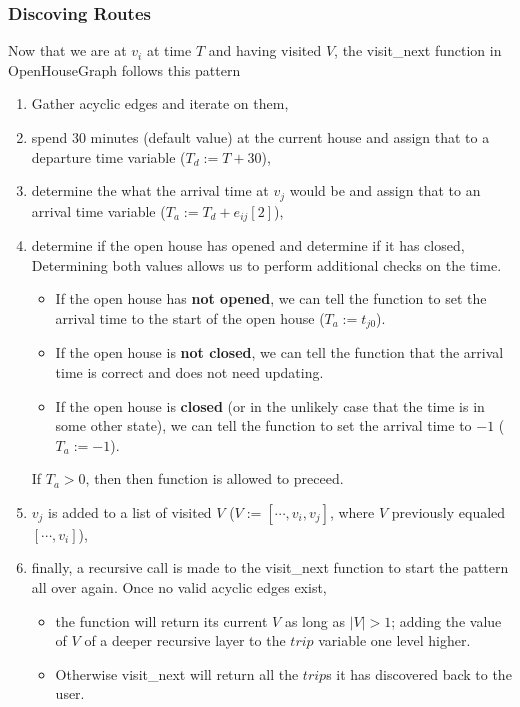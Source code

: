 \documentclass[letterpaper,11pt]{report}
\theoremstyle{definition}
\theoremstyle{definition}
\begin{document}
\subsubsection{Discoving Routes}
Now that we are at $v_i$ at time $T$ and having visited $V$, the \textsf{visit\_next} function in \textsf{OpenHouseGraph} follows this pattern
\begin{enumerate}
  \item Gather acyclic edges and iterate on them,
  \item spend 30 minutes (default value) at the current house and assign that to a departure time variable ($T_d := T + 30$),
  \item determine the what the arrival time at $v_j$ would be and assign that to an arrival time variable ($T_a := T_d + e_{ij}[2]$),
  \item determine if the open house has opened and determine if it has closed,\\
  \hspace*{0.5em} Determining both values allows us to perform additional checks on the time.
    \begin{itemize}
      \item If the open house has \textbf{not opened}, we can tell the function to set the arrival time to the start of the open house ($T_a := t_{j0}$).
      \item If the open house is \textbf{not closed}, we can tell the function that the arrival time is correct and does not need updating.
      \item If the open house is \textbf{closed} (or in the unlikely case that the time is in some other state), we can tell the function to set the arrival time to $-1$ ($T_a := -1$).
    \end{itemize}
    \hspace*{0.5em} If $T_a > 0$, then then function is allowed to preceed.
  \item $v_j$ is added to a list of visited $V$ ($V := [\cdots , v_i, v_j]$, where $V$ previously equaled $[\cdots , v_i]$),
  \item finally, a recursive call is made to the \textsf{visit\_next} function to start the pattern all over again. Once no valid acyclic edges exist, 
    \begin{itemize}
      \item the function will return its current $V$ as long as $|V| > 1$; adding the value of $V$ of a deeper recursive layer to the $trip$ variable one level higher. 
      \item Otherwise \textsf{visit\_next} will return all the $trip$s it has discovered back to the user.
    \end{itemize}
\end{enumerate}
\end{document}

